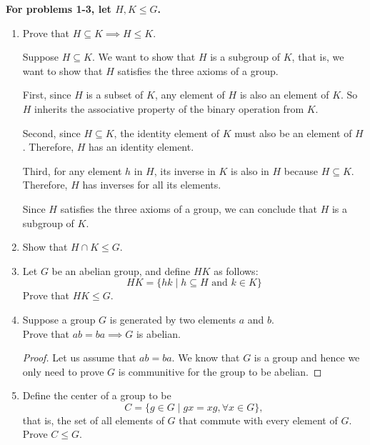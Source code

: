 \documentclass[12pt]{article}
\begin{document}
\textbf{For problems 1-3, let $H, K \leq G$.}
 \begin{enumerate}
    \item Prove that $H \subseteq K \implies H \leq K$.
    
	Suppose $H \subseteq K$. We want to show that $H$ is a subgroup of $K$, that is, we want to show that $H$ satisfies the three axioms of a group.

First, since $H$ is a subset of $K$, any element of $H$ is also an element of $K$. So $H$ inherits the associative property of the binary operation from $K$.

Second, since $H \subseteq K$, the identity element of $K$ must also be an element of $H$. Therefore, $H$ has an identity element.

Third, for any element $h$ in $H$, its inverse in $K$ is also in $H$ because $H \subseteq K$. Therefore, $H$ has inverses for all its elements.

Since $H$ satisfies the three axioms of a group, we can conclude that $H$ is a subgroup of $K$.

    \item Show that $H \cap K \leq G$.
 
    \item Let $G$ be an abelian group, and define $HK$ as follows:
        \[HK = \{hk \mid h \subseteq H \text{  and  } k \in K\}\]
        Prove that $HK \leq G$.
 
    \item Suppose a group $G$ is generated by two elements $a$ and $b$.\\
        Prove that $ab = ba \implies G$ is abelian.
        \begin{proof}
			Let us assume that $ab=ba$. We know that $G$ is a group and hence we only need to prove $G$ is communitive for the group to be abelian.
        \end{proof}

    \item Define the center of a group to be
        \[C = \{g \in G \mid gx = xg, \forall x \in G\},\]
        that is, the set of all elements of $G$ that commute with every element of $G$.\\
        Prove $C \leq G$.

	


 \end{enumerate}
\end{document}
